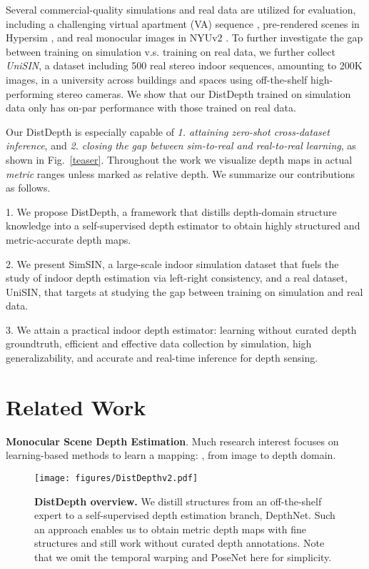 \documentclass[10pt,twocolumn,letterpaper]{article}
\begin{document}
Several commercial-quality simulations and real data are utilized for evaluation, including a challenging virtual apartment (VA) sequence \cite{UE4Environment, UnrealEngine4}, pre-rendered scenes in Hypersim \cite{roberts2020hypersim}, and real monocular images in NYUv2 \cite{silberman2012indoor}. To further investigate the gap between training on simulation v.s. training on real data, we further collect \textit{UniSIN}, a dataset including 500 real stereo indoor sequences, amounting to 200K images, in a university across buildings and spaces using off-the-shelf high-performing stereo cameras. We show that our DistDepth trained on simulation data only has on-par performance with those trained on real data. 

Our DistDepth is especially capable of \textit{1. attaining zero-shot cross-dataset inference}, and \textit{2. closing the gap between sim-to-real and real-to-real learning}, as shown in Fig.~\ref{teaser}. Throughout the work we visualize depth maps in actual \textit{metric} ranges unless marked as relative depth.
We summarize our contributions as follows.

1. We propose DistDepth, a framework that distills depth-domain structure knowledge into a self-supervised depth estimator to obtain highly structured and metric-accurate depth maps. 

2. We present SimSIN, a large-scale indoor simulation dataset that fuels the study of indoor depth estimation via left-right consistency, and a real dataset, UniSIN, that targets at studying the gap between training on simulation and real data.


3. We attain a practical indoor depth estimator: learning without curated depth groundtruth, efficient and effective data collection by simulation, high generalizability, and accurate and real-time inference for depth sensing. 

\section{Related Work}
\label{sec:related}
\textbf{Monocular Scene Depth Estimation}. Much research interest focuses on learning-based methods to learn a mapping: , from image to depth domain. 

\begin{figure*}[hbt]
    \centering
    \texttt{[image: figures/DistDepthv2.pdf]}
    \vspace{-8pt}
    \caption{\textbf{DistDepth overview.} We distill structures from an off-the-shelf expert to a self-supervised depth estimation branch, DepthNet. Such an approach enables us to obtain metric depth maps with fine structures and still work without curated depth annotations. Note that we omit the temporal warping and PoseNet here for simplicity.}
    \vspace{-13pt}
    \label{distdepth}
\end{figure*}
\end{document}
